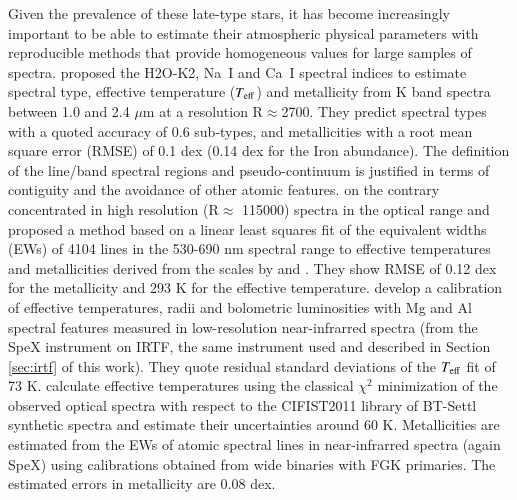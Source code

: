 Given the prevalence of these late-type stars, it has become
increasingly important to be able to estimate their atmospheric
physical parameters with reproducible methods that provide homogeneous
values for large samples of spectra. \cite{2012ApJ...748...93R}
proposed the H2O-K2, Na~{\sc I} and Ca~{\sc I} spectral indices to
estimate spectral type, effective temperature ($T_{\rm eff}$) and
metallicity from K band spectra between 1.0 and 2.4 $\mu$m at a
resolution R$\approx$2700. They predict spectral types with a quoted
accuracy of 0.6 sub-types, and metallicities with a root mean square
error (RMSE) of 0.1 dex (0.14 dex for the Iron abundance). The
definition of the line/band spectral regions and pseudo-continuum is
justified in terms of contiguity and the avoidance of other atomic
features. \cite{2014A&A...568A.121N} on the contrary concentrated in
high resolution (R$\approx$ 115000) spectra in the optical range and
proposed a method based on a linear least squares fit of the
equivalent widths (EWs) of 4104 lines in the 530-690 nm spectral range
to effective temperatures and metallicities derived from the scales
by \cite{2012A&A...538A..25N} and \cite{2008MNRAS.389..585C}. They
show RMSE of 0.12 dex for the metallicity and 293 K for the effective
temperature. \cite{2015ApJ...800...85N} develop a calibration of
effective temperatures, radii and bolometric luminosities with Mg and
Al spectral features measured in low-resolution near-infrarred spectra
(from the SpeX instrument on IRTF, the same instrument used and
described in Section \ref{sec:irtf} of this work). They quote residual
standard deviations of the $T_{\rm eff}$ fit of 73 K. \cite{Mann2015}
calculate effective temperatures using the classical $\chi^2$
minimization of the observed optical spectra with respect to the
CIFIST2011 library of BT-Settl synthetic spectra and estimate their
uncertainties around 60 K. Metallicities are estimated from the EWs of
atomic spectral lines in near-infrarred spectra (again SpeX) using
calibrations obtained from wide binaries with FGK primaries. The
estimated errors in metallicity are 0.08
dex. 

